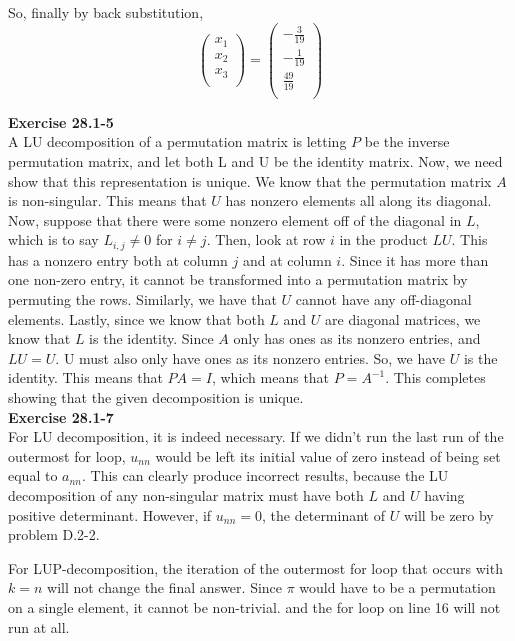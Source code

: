 \documentclass{article}
\begin{document}
So, finally by back substitution,
\[
  \left(\begin{array}{c}
 x_1\\
 x_2\\
 x_3\\
 \end{array}\right) 
=
  \left(\begin{array}{c}
 -\frac{3}{19}\\
 -\frac{1}{19}\\
 \frac{49}{19}\\
 \end{array}\right) 
\]

\noindent\textbf{Exercise 28.1-5}\\
A LU decomposition of a permutation matrix is letting $P$ be the inverse permutation matrix, and let both L and U be the identity matrix. Now, we need show that this representation is unique. We know that the permutation matrix $A$ is non-singular. This means that $U$ has nonzero elements all along its diagonal. Now, suppose that there were some nonzero element off of the diagonal in $L$, which is to say $L_{i,j}\neq 0$ for $i\neq j$. Then, look at row $i$ in the product $LU$. This has a nonzero entry both at column $j$ and at column $i$. Since it has more than one non-zero entry, it cannot be transformed into a permutation matrix by permuting the rows. Similarly, we have that $U$ cannot have any off-diagonal elements. Lastly, since we know that both $L$ and $U$ are diagonal matrices, we know that $L$ is the identity. Since $A$ only has ones as its nonzero entries, and $LU =U$. U must also only have ones as its nonzero entries. So, we have $U$ is the identity. This means that $PA =I$, which means that $P = A^{-1}$. This completes showing that the given decomposition is unique.\\

\noindent\textbf{Exercise 28.1-7}\\
For LU decomposition, it is indeed necessary. If we didn't run the last run of the outermost for loop, $u_{nn}$ would be left its initial value of zero instead of being set equal to $a_{nn}$. This can clearly produce incorrect results, because the LU decomposition of any non-singular matrix must have both $L$ and $U$ having positive determinant. However, if $u_{nn}=0$, the determinant of $U$ will be zero by problem D.2-2.

For LUP-decomposition, the iteration of the outermost for loop that occurs with $k=n$ will not change the final answer. Since $\pi$ would have to be a permutation on a single element, it cannot be non-trivial. and the for loop on line 16 will not run at all.\\
\end{document}
